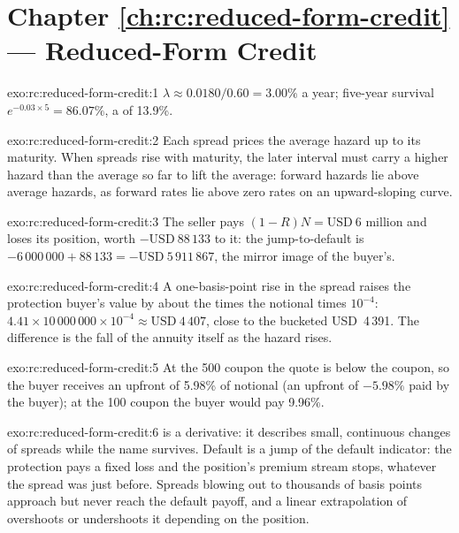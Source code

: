 \section*{Chapter \ref{ch:rc:reduced-form-credit} --- Reduced-Form Credit}

\begin{solution}{exo:rc:reduced-form-credit:1}
$\lambda \approx 0.0180/0.60 = 3.00\%$ a year; five-year survival $e^{-0.03\times5} = 86.07\%$,
a  of 13.9\%.
\end{solution}

\begin{solution}{exo:rc:reduced-form-credit:2}
Each spread prices the average hazard up to its maturity. When spreads rise with maturity,
the later interval must carry a higher hazard than the average so far to lift the
average: forward hazards lie above average hazards, as forward rates lie above zero rates
on an upward-sloping curve.
\end{solution}

\begin{solution}{exo:rc:reduced-form-credit:3}
The seller pays $(1-R)N = \text{USD}~6$ million and loses its position, worth
$-\text{USD}~88\,133$ to it: the jump-to-default is $-6\,000\,000+88\,133 = -\text{USD}~5\,911\,867$,
the mirror image of the buyer's.
\end{solution}

\begin{solution}{exo:rc:reduced-form-credit:4}
A one-basis-point rise in the spread raises the protection buyer's value by about the
 times the notional times $10^{-4}$: $4.41\times10\,000\,000\times10^{-4} \approx
\text{USD}~4\,407$, close to the bucketed USD~4\,391. The difference is the fall of the
annuity itself as the hazard rises.
\end{solution}

\begin{solution}{exo:rc:reduced-form-credit:5}
At the 500 coupon the quote is below the coupon, so the buyer receives an upfront of
5.98\% of notional (an upfront of $-5.98\%$ paid by the buyer); at the 100 coupon the
buyer would pay 9.96\%.
\end{solution}

\begin{solution}{exo:rc:reduced-form-credit:6}
 is a derivative: it describes small, continuous changes of spreads while the name
survives. Default is a jump of the default indicator: the protection pays a fixed loss and
the position's premium stream stops, whatever the spread was just before. Spreads blowing
out to thousands of basis points approach but never reach the default payoff, and a
linear extrapolation of  overshoots or undershoots it depending on the position.
\end{solution}

